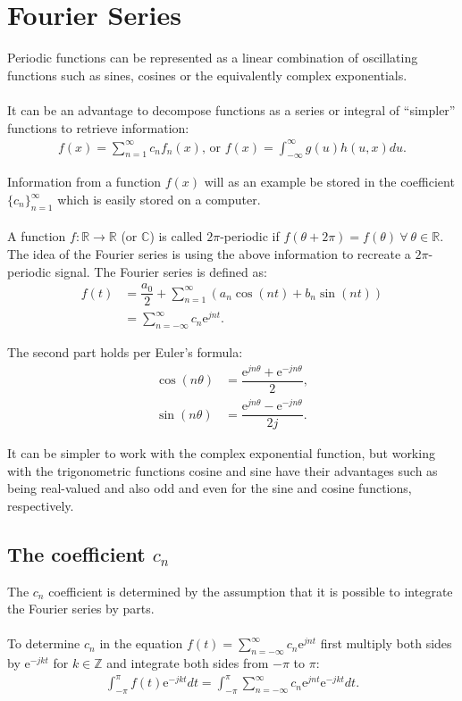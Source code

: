 \chapter{Fourier Series} \label{appA:Fourierseries}
Periodic functions can be represented as a linear combination of oscillating functions such as sines, cosines or the equivalently complex exponentials.
\\ \\
It can be an advantage to decompose functions as a series or integral of ``simpler'' functions to retrieve information:
\begin{align*}
f(x) = \sum_{n=1}^\infty c_n f_n(x)\text{, or } f(x)= \int_{-\infty}^\infty g(u) h(u,x) du.
\end{align*}

Information from a function $f(x)$ will as an example be stored in the coefficient $\{c_n\}_{n=1}^\infty$ which is easily stored on a computer.
\\ \\
A function $f: \mathbb{R} \to \mathbb{R}$ (or $\mathbb{C}$) is called $2\pi$-periodic if $f(\theta + 2\pi) = f(\theta) \ \forall \ \theta\in\mathbb{R}$. The idea of the Fourier series is using the above information to recreate a $2\pi$-periodic signal. The Fourier series is defined as:
\begin{align*}
f(t) &= \dfrac{a_0}{2} + \sum_{n=1}^\infty(a_n \cos(n t) + b_n \sin(n t))\\
&= \sum_{n=-\infty}^{\infty} c_n \text{e}^{j n t}.
\end{align*}

The second part holds per Euler's formula:
\begin{align*}
\cos(n\theta) &= \dfrac{\text{e}^{j n \theta} + \text{e}^{-j n \theta}}{2}, \\
\sin(n \theta) &= \dfrac{\text{e}^{jn\theta}-\text{e}^{-jn\theta}}{2j}.
\end{align*}

It can be simpler to work with the complex exponential function, but working with the trigonometric functions cosine and sine have their advantages such as being real-valued and also odd and even for the sine and cosine functions, respectively.

\section{The coefficient $c_n$}
The $c_n$ coefficient is determined by the assumption that it is possible to integrate the Fourier series by parts.
\\ \\
To determine $c_n$ in the equation $f(t)= \sum_{n=-\infty}^{\infty} c_n \text{e}^{j n t}$ first multiply both sides by $\text{e}^{-j k t}$ for $k\in \mathbb{Z}$ and integrate both sides from $-\pi$ to $\pi$:
\begin{align} \label{eq:firststep_fouriercoefficient}
\int_{-\pi}^\pi f(t)\text{e}^{-j k t} dt = \int_{-\pi}^\pi \sum_{n=-\infty}^{\infty} c_n \text{e}^{j n t} \text{e}^{-j k t} dt.
\end{align}


